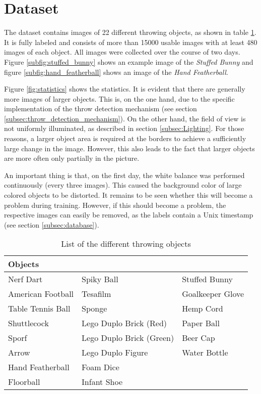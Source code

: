 \section{Dataset}
\label{sec:dataset}

The dataset contains images of 22 different throwing objects, as shown in table \ref{tab:objects}.
It is fully labeled and consists of more than \num{15000} usable images with at least 480 images of each object.
All images were collected over the course of two days.
Figure \ref{subfig:stuffed_bunny} shows an example image of the \textit{Stuffed Bunny} and figure \ref{subfig:hand_featherball} shows an image of the \textit{Hand Featherball}.

Figure \ref{fig:statistics} shows the statistics.
It is evident that there are generally more images of larger objects.
This is, on the one hand, due to the specific implementation of the throw detection mechanism (see section \ref{subsec:throw_detection_mechanism}).
On the other hand, the field of view is not uniformly illuminated, as described in section \ref{subsec:Lighting}.
For those reasons, a larger object area is required at the borders to achieve a sufficiently large change in the image.
However, this also leads to the fact that larger objects are more often only partially in the picture.

An important thing is that, on the first day, the white balance was performed continuously (every three images).
This caused the background color of large colored objects to be distorted.
It remains to be seen whether this will become a problem during training.
However, if this should become a problem, the respective images can easily be removed, as the labels contain a Unix timestamp (see section \ref{subsec:database}).

\begin{table}[hb]
  \caption{List of the different throwing objects}
  \label{tab:objects}
  \centering
  \begin{tabular}{lll}
    \toprule
    \textbf{Objects} &  &  \\
    \midrule
	Nerf Dart & Spiky Ball & Stuffed Bunny \\
	American Football & Tesafilm & Goalkeeper Glove \\
	Table Tennis Ball & Sponge & Hemp Cord \\
	Shuttlecock & Lego Duplo Brick (Red) & Paper Ball \\
	Sporf & Lego Duplo Brick (Green) & Beer Cap \\
	Arrow & Lego Duplo Figure & Water Bottle \\
	Hand Featherball & Foam Dice &  \\
	Floorball & Infant Shoe &  \\
    \bottomrule
  \end{tabular}
\end{table}

